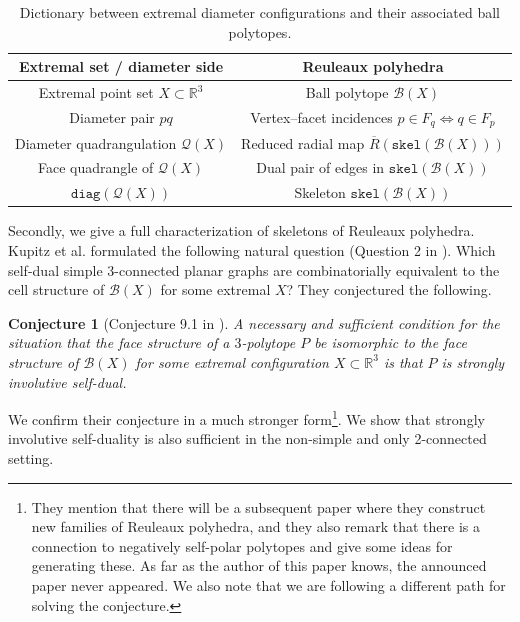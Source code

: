 \documentclass{article}
\renewcommand{\arraystretch}{1.5}
\newtheorem{conjecture}[theorem]{Conjecture}
\newcommand{\Bc}[0]{\mathcal{B}}
\newcommand{\skel}[0]{\mathtt{skel}}
\newcommand{\diag}[0]{\mathtt{diag}}
\newcommand{\qt}{\mathcal{Q}}
\begin{document}
\begin{table}[ht]
\centering

\renewcommand{\arraystretch}{1.25}
\begin{tabular}{c|c}
\textbf{Extremal set / diameter side}
&
\textbf{Reuleaux polyhedra }
\\
\hline

Extremal point set $X\subset \mathbb R^3$
&
Ball polytope $\Bc(X)$
\\


Diameter pair $pq$
&
Vertex--facet incidences $p\in F_q \Leftrightarrow  q\in F_p$
\\


Diameter quadrangulation $\qt(X)$
&
Reduced radial map $\overline R(\skel(\Bc(X)))$
\\

Face quadrangle of $\qt(X)$
&
Dual pair of edges in $\skel(\Bc(X))$
\\
$\diag(\qt(X))$
&
Skeleton $\skel(\Bc(X))$
\\


\end{tabular}
\caption{Dictionary between extremal diameter configurations and their associated ball polytopes.}
\label{tab:extremal-ball polytope-dictionary}
\end{table}


Secondly, we give a full characterization of skeletons of Reuleaux polyhedra. Kupitz et al. formulated the following natural question (Question 2 in \cite{kupitz2010ball}). Which self-dual simple 3-connected planar graphs are combinatorially equivalent to the cell structure of $\Bc(X)$ for some extremal $X$? They conjectured the following.

\begin{conjecture}[Conjecture 9.1 in \cite{kupitz2010ball}]\label{conj:kupitz}
A necessary and sufficient condition for the situation that the face structure of a $3$-polytope $P$ be isomorphic to the face structure of $\Bc(X)$ for some extremal configuration $X \subset \mathbb{R}^3$ is that $P$ is strongly involutive self-dual.
\end{conjecture}

 We confirm their conjecture in a much stronger form\footnote{They mention that there will be a subsequent paper where they construct new families of Reuleaux polyhedra, and they also remark that there is a connection to negatively self-polar polytopes and give some ideas for generating these. As far as the author of this paper knows, the announced paper never appeared. We also note that we are following a different path for solving the conjecture.  
}. We show  that strongly involutive self-duality is also sufficient in the non-simple and only 2-connected setting.
\end{document}
